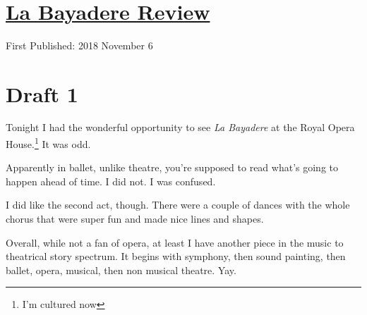 \documentclass[12pt]{article}[titlepage]
\newcommand{\1}{\={a}}
\newcommand{\2}{\={e}}
\newcommand{\3}{\={\i}}
\newcommand{\4}{\=o}
\newcommand{\5}{\=u}
\newcommand{\6}{\={A}}
\renewcommand{\,}{\textsuperscript{,}}
\begin{document}

\doublespacing
\section{\href{la-bayadere.html}{La Bayadere Review}}
First Published: 2018 November 6
\section{Draft 1}
Tonight I had the wonderful opportunity to see \textit{La Bayadere} at the Royal Opera House.\footnote{I'm cultured now}
It was odd.

Apparently in ballet, unlike theatre, you're supposed to read what's going to happen ahead of time.
I did not.
I was confused. 

I did like the second act, though.
There were a couple of dances with the whole chorus that were super fun and made nice lines and shapes.

Overall, while not a fan of opera, at least I have another piece in the music to theatrical story spectrum.
It begins with symphony, then sound painting, then ballet, opera, musical, then non musical theatre.
Yay.
\end{document}

